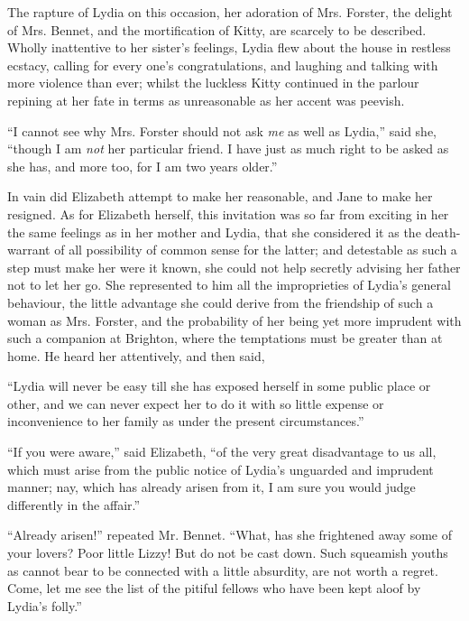 The rapture of Lydia on this occasion, her adoration of
Mrs. Forster, the delight of Mrs. Bennet, and the mortification
of Kitty, are scarcely to be described. Wholly inattentive
to her sister’s feelings, Lydia flew about the house in
restless ecstacy, calling for every one’s congratulations, and
laughing and talking with more violence than ever; whilst
the luckless Kitty continued in the parlour repining at her
fate in terms as unreasonable as her accent was peevish.

“I cannot see why Mrs. Forster should not ask \textit{me} as
well as Lydia,” said she, “though I am \textit{not} her particular
friend. I have just as much right to be asked as she has,
and more too, for I am two years older.”

In vain did Elizabeth attempt to make her reasonable,
and Jane to make her resigned. As for Elizabeth herself,
this invitation was so far from exciting in her the same
feelings as in her mother and Lydia, that she considered
it as the death-warrant of all possibility of common sense
for the latter; and detestable as such a step must make
her were it known, she could not help secretly advising
her father not to let her go. She represented to him all
the improprieties of Lydia’s general behaviour, the little
advantage she could derive from the friendship of such
a woman as Mrs. Forster, and the probability of her being
yet more imprudent with such a companion at Brighton,
where the temptations must be greater than at home.
He heard her attentively, and then said,

“Lydia will never be easy till she has exposed herself
in some public place or other, and we can never expect her
to do it with so little expense or inconvenience to her
family as under the present circumstances.”

“If you were aware,” said Elizabeth, “of the very great
disadvantage to us all, which must arise from the public
notice of Lydia’s unguarded and imprudent manner; nay,
which has already arisen from it, I am sure you would
judge differently in the affair.”

“Already arisen!” repeated Mr. Bennet. “What, has
she frightened away some of your lovers? Poor little
Lizzy! But do not be cast down. Such squeamish youths
as cannot bear to be connected with a little absurdity,
are not worth a regret. Come, let me see the list of the
pitiful fellows who have been kept aloof by Lydia’s folly.”

